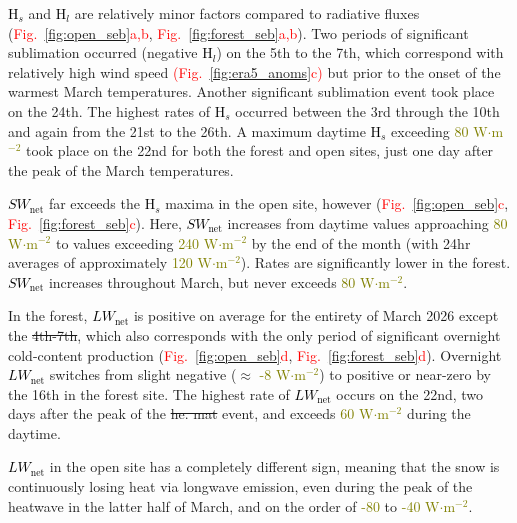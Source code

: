 \documentclass[draft]{agujournal2019}
\newcommand{\fig}[2]{\textcolor{red}{(Fig.~\ref{#1}{#2})}}   %
\newcommand{\fignop}[2]{\textcolor{red}{Fig.~\ref{#1}{#2}}}  %
\newcommand{\mynum}[1]{\textcolor{olive}{#1}}
\newcommand{\lwnet}{\textcolor{black}{$LW_{\mathrm{net}}$}\xspace}
\newcommand{\hs}{\textcolor{black}{H$_s$}\xspace}
\newcommand{\hlat}{\textcolor{black}{H$_l$}\xspace}
\newcommand{\swnet}{\textcolor{black}{$SW_{\mathrm{net}}$}\xspace}
\newcommand{\wmsq}{\textcolor{olive}{W$\cdot$m$^{-2}$}\xspace}
\providecommand{\DIFadd}[1]{{\protect\color{blue}\uwave{#1}}} %
\providecommand{\DIFdel}[1]{{\protect\color{red}\sout{#1}}}                      %
\providecommand{\DIFaddbegin}{} %
\providecommand{\DIFaddend}{} %
\providecommand{\DIFdelbegin}{} %
\providecommand{\DIFdelend}{} %
\begin{document}
\hs and \hlat are relatively minor factors compared to radiative fluxes (\fignop{fig:open_seb}{a,b}, \fignop{fig:forest_seb}{a,b}).
Two periods of significant sublimation occurred (negative \hlat) on the 5th to the 7th, which correspond with relatively high wind speed \fig{fig:era5_anoms}{c} but prior to the onset of the warmest March temperatures.
Another significant sublimation event took place on the 24th.
The highest rates of \hs occurred between the 3rd through the 10th and again from the 21st to the 26th.
A maximum daytime \hs exceeding \mynum{80} \wmsq took place on the 22nd for both the forest and open sites, just one day after the peak of the March temperatures.

\swnet far exceeds the \hs maxima in the open site, however  (\fignop{fig:open_seb}{c}, \fignop{fig:forest_seb}{c}).
Here, \swnet increases from daytime values approaching \mynum{80} \wmsq to values exceeding \mynum{240} \wmsq by the end of the month (with 24hr averages of approximately  \mynum{120} \wmsq).
Rates are significantly lower in the forest.
\swnet increases throughout March, but never exceeds \mynum{80} \wmsq.

In the forest, \lwnet is positive on average for the entirety of March 2026 except the \DIFdelbegin \DIFdel{4th-7th}\DIFdelend \DIFaddbegin \DIFadd{4th--7th}\DIFaddend , which also corresponds with the only period of significant overnight cold-content production (\fignop{fig:open_seb}{d}, \fignop{fig:forest_seb}{d}).
Overnight \lwnet switches from slight negative ($\approx$ \mynum{-8} \wmsq) to positive or near-zero by the 16th in the forest site.
The highest rate of \lwnet occurs on the 22nd, two days after the peak of the \DIFdelbegin \DIFdel{he. mat }\DIFdelend \DIFaddbegin \DIFadd{heatwave }\DIFaddend event, and exceeds \mynum{60} \wmsq during the daytime.

\lwnet in the open site has a completely different sign, meaning that the snow is continuously losing heat via longwave emission, even during the peak of the heatwave in the latter half of March, and on the order of \mynum{-80} to \mynum{-40} \wmsq.
\end{document}
